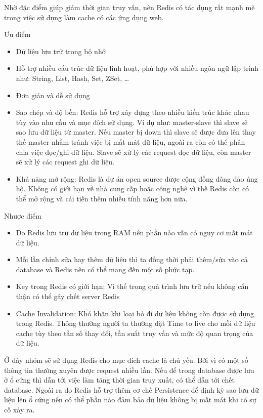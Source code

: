 \begin{itemize}
            Nhờ đặc điểm giúp giảm thời gian truy vấn, nên Redis có tác dụng rất mạnh mẽ trong việc sử dụng làm cache có các ứng dụng web.
            
            Ưu điểm
            
            \begin{itemize}
                \item Dữ liệu lưu trữ trong bộ nhớ
                \item Hỗ trợ nhiều cấu trúc dữ liệu linh hoạt, phù hợp với nhiều ngôn ngữ lập trình như: String, List, Hash, Set, ZSet, …
                \item Đơn giản và dễ sử dụng
                \item Sao chép và độ bền: Redis hỗ trợ xây dựng theo nhiều kiến trúc khác nhau tùy vào nhu cầu và mục đích sử dụng. Ví dụ như: master-slave thì slave sẽ sao lưu dữ liệu từ master. Nếu master bị down thì slave sẽ được đưa lên thay thế master nhằm tránh việc bị mất mát dữ liệu, ngoài ra còn có thể phân chia việc đọc/ghi dữ liệu. Slave sẽ xử lý các request đọc dữ liệu, còn master sẽ xử lý các request ghi dữ liệu.
                \item Khả năng mở rộng: Redis là dự án open source được cộng đồng đông đảo ủng hộ. Không có giới hạn về nhà cung cấp hoặc công nghệ vì thế Redis còn có thể mở rộng và cải tiến thêm nhiều tính năng hơn nữa.
            \end{itemize}
            
            Nhược điểm
            
            \begin{itemize}
                \item Do Redis lưu trữ dữ liệu trong RAM nên phần nào vẫn có nguy cơ mất mát dữ liệu.
                \item Mỗi lần chỉnh sửa hay thêm dữ liệu thì ta đồng thời phải thêm/sửa vào cả database và Redis nên có thể mang đến một số phức tạp.
                \item Key trong Redis có giới hạn: Vì thế trong quá trình lưu trữ nếu không cẩn thận có thể gây chết server Redis
                \item Cache Invalidation: Khó khăn khi loại bỏ đi dữ liệu không còn được sử dụng trong Redis. Thông thường người ta thường đặt Time to live cho mỗi dữ liệu cache tùy theo tần số thay đổi, tần suất truy vấn và mức độ quan trọng của dữ liệu.
            \end{itemize}
            
            Ở đây nhóm sẽ sử dụng Redis cho mục đích cache là chủ yếu. Bởi vì có một số thông tin thường xuyên được request nhiều lần. Nếu để trong database được lưu ở ổ cứng thì dẫn tới việc làm tăng thời gian truy xuất, có thể dẫn tới chết database. Ngoài ra do Redis hỗ trợ thêm cơ chế Persistence để định kỳ sao lưu dữ liệu lên ổ cứng nên có thể phần nào đảm bảo dữ liệu không bị mất mát khi có sự cố xảy ra.
            

\end{itemize}
